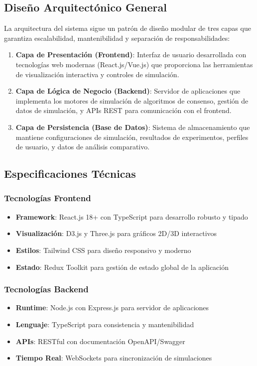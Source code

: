 \documentclass[spanish,12pt,letterpaper]{report}
\begin{document}
\subsection{Diseño Arquitectónico General}

La arquitectura del sistema sigue un patrón de diseño modular de tres capas que garantiza escalabilidad, mantenibilidad y separación de responsabilidades:

\begin{enumerate}
    \item \textbf{Capa de Presentación (Frontend)}: Interfaz de usuario desarrollada con tecnologías web modernas (React.js/Vue.js) que proporciona las herramientas de visualización interactiva y controles de simulación.
    
    \item \textbf{Capa de Lógica de Negocio (Backend)}: Servidor de aplicaciones que implementa los motores de simulación de algoritmos de consenso, gestión de datos de simulación, y APIs REST para comunicación con el frontend.
    
    \item \textbf{Capa de Persistencia (Base de Datos)}: Sistema de almacenamiento que mantiene configuraciones de simulación, resultados de experimentos, perfiles de usuario, y datos de análisis comparativo.
\end{enumerate}

\subsection{Especificaciones Técnicas}

\subsubsection{Tecnologías Frontend}
\begin{itemize}
    \item \textbf{Framework}: React.js 18+ con TypeScript para desarrollo robusto y tipado
    \item \textbf{Visualización}: D3.js y Three.js para gráficos 2D/3D interactivos
    \item \textbf{Estilos}: Tailwind CSS para diseño responsivo y moderno
    \item \textbf{Estado}: Redux Toolkit para gestión de estado global de la aplicación
\end{itemize}

\subsubsection{Tecnologías Backend}
\begin{itemize}
    \item \textbf{Runtime}: Node.js con Express.js para servidor de aplicaciones
    \item \textbf{Lenguaje}: TypeScript para consistencia y mantenibilidad
    \item \textbf{APIs}: RESTful con documentación OpenAPI/Swagger
    \item \textbf{Tiempo Real}: WebSockets para sincronización de simulaciones
\end{itemize}
\end{document}
